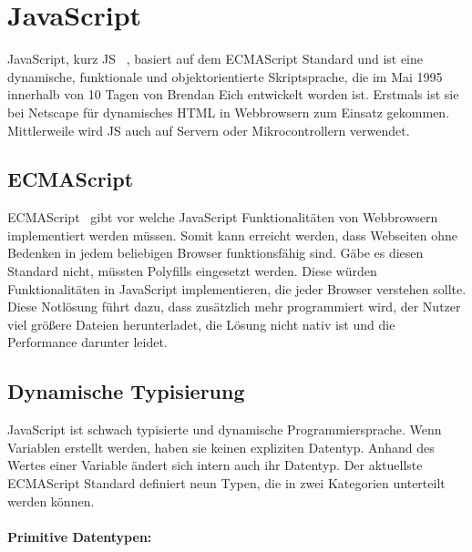 \newpage
\section{JavaScript}
JavaScript, kurz JS~\cite{javascript_2021} , basiert auf dem ECMAScript Standard und ist eine dynamische, funktionale und objektorientierte Skriptsprache, die im Mai 1995 innerhalb von 10 Tagen von Brendan Eich entwickelt worden ist. Erstmals ist sie bei Netscape für dynamisches HTML in Webbrowsern zum Einsatz gekommen. Mittlerweile wird JS auch auf Servern oder Mikrocontrollern verwendet.

\subsection{ECMAScript}
ECMAScript~\cite{ecma_262_2020} gibt vor welche JavaScript Funktionalitäten von Webbrowsern implementiert werden müssen. Somit kann erreicht werden, dass Webseiten ohne Bedenken in jedem beliebigen Browser funktionsfähig sind. Gäbe es diesen Standard nicht, müssten Polyfills eingesetzt werden. Diese würden Funktionalitäten in JavaScript implementieren, die jeder Browser verstehen sollte. Diese Notlösung führt dazu, dass zusätzlich mehr programmiert wird, der Nutzer viel größere Dateien herunterladet, die Lösung nicht nativ ist und die Performance darunter leidet. 

\subsection{Dynamische Typisierung}
JavaScript ist schwach typisierte und dynamische Programmiersprache. Wenn Variablen erstellt werden, haben sie keinen expliziten Datentyp. Anhand des Wertes einer Variable ändert sich intern auch ihr Datentyp. Der aktuellste ECMAScript Standard definiert neun Typen, die in zwei Kategorien unterteilt werden können.

\paragraph{Primitive Datentypen:}

